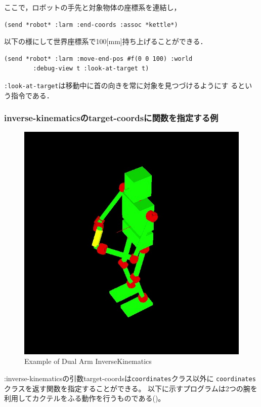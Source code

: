 ここで，ロボットの手先と対象物体の座標系を連結し，
{\baselineskip=10pt
\begin{verbatim}
(send *robot* :larm :end-coords :assoc *kettle*)
\end{verbatim}
}

以下の様にして世界座標系で100[mm]持ち上げることができる．
{\baselineskip=10pt
\begin{verbatim}
(send *robot* :larm :move-end-pos #f(0 0 100) :world
        :debug-view t :look-at-target t)
\end{verbatim}
}
\verb|:look-at-target|は移動中に首の向きを常に対象を見つづけるようにす
るという指令である．

\subsubsection{inverse-kinematicsのtarget-coordsに関数を指定する例}

\begin{figure}[htb]
  \begin{center}
    \includegraphics[width=0.49\columnwidth]{fig/dual-arm-ik.jpg}
    \caption{Example of Dual Arm InverseKinematics}
  \end{center}
\end{figure}

:inverse-kinematicsの引数target-coordsは\verb|coordinates|クラス以外に
\verb|coordinates|クラスを返す関数を指定することができる。
以下に示すプログラムは2つの腕を利用してカクテルをふる動作を行うものである()。

